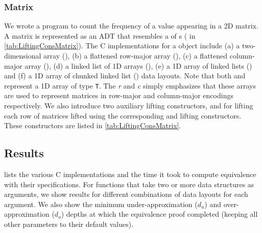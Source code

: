 \subsubsection{Matrix} We wrote a
\SpecL{} program to count the frequency of a value appearing in a 2D matrix.
A matrix is represented as an ADT that resembles a  of s ( in \cref{tab:LiftingConsMatrix}).
The C implementations for a  object include
(a) a two-dimensional array (), (b) a flattened row-major array (),
(c) a flattened column-major array (), (d) a linked list of 1D arrays (),
(e) a 1D array of linked lists () and (f) a 1D array of chunked linked list ()
data layouts. Note that both  and  represent a 1D array of type {\tt T}. The {\em r} and {\em c} simply
emphasizes that these arrays are used to represent matrices in row-major and column-major encodings respectively.
We also introduce two auxiliary lifting constructors,  and 
for lifting each row of matrices lifted using the corresponding  and   lifting
constructors. These constructors are listed in \cref{tab:LiftingConsMatrix}.


\vspace{-12px}
\subsection{Results}
\vspace{-10px}
 lists the various C implementations and the time it took
to compute equivalence with their specifications. For functions that
take two or more data structures as arguments, we show
results for different combinations of data layouts for each argument.
We also show the minimum under-approximation ($d_u$) and over-approximation ($d_o$) depths
at which the equivalence proof completed (keeping all other parameters to their
default values).

